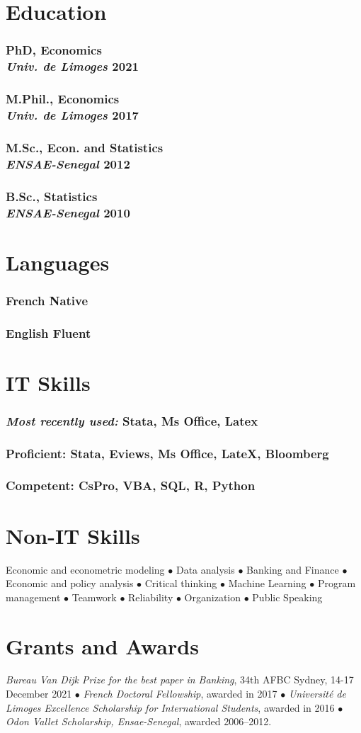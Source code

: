 \documentclass[9pt, oneside]{memoir}
\newcommand{\position}[2]{\subsubsection{#1
    \hfill
    #2}}
\begin{document}
\sidebar{
 

}

\sidebar{
 
}

    \section{Education}
    \position{PhD, Economics\\\emph{Univ. de Limoges}}{2021}
    \position{M.Phil., Economics\\\emph{Univ. de Limoges}}{2017}
    \position{M.Sc., Econ. and Statistics\\\emph{ENSAE-Senegal}}{2012}
    \position{B.Sc., Statistics\\\emph{ENSAE-Senegal}}{2010}

    \section{Languages}
\position{French}{Native}
\position{English}{Fluent}

   \section{IT Skills}
\position{\emph{Most recently used:}}{Stata, Ms Office, Latex}
\position{Proficient:}{Stata, Eviews, Ms Office, LateX, Bloomberg}  
 \position{Competent:}{CsPro, VBA, SQL, R, Python}





   \section{Non-IT Skills}
     Economic and econometric modeling $\bullet $  Data analysis $\bullet $ Banking and Finance $\bullet $ Economic and policy analysis $\bullet $  Critical thinking $\bullet $  Machine Learning  $\bullet $ Program management
$\bullet $ Teamwork
$\bullet $ Reliability $\bullet $ Organization
$\bullet $ Public Speaking 

   \section{Grants and Awards}
 \emph{Bureau Van Dijk Prize for the best paper in Banking}, 34th AFBC Sydney, 14-17 December 2021 $\bullet $ \emph{French Doctoral Fellowship}, awarded in 2017 $\bullet $ \emph{Université de Limoges Excellence Scholarship for International Students}, awarded in 2016 $\bullet $ \emph{Odon Vallet Scholarship, Ensae-Senegal}, awarded 2006--2012. 

\end{document}
